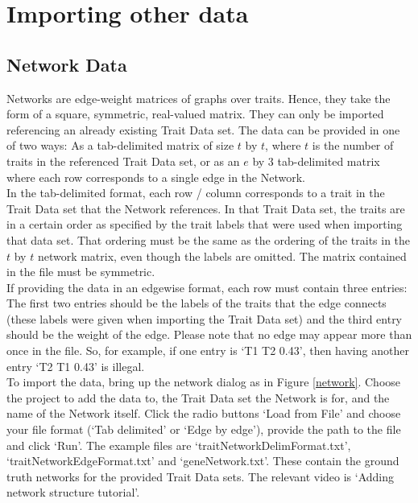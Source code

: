 \documentclass{article}
\begin{document}
\section{Importing other data}

\subsection{Network Data}

Networks are edge-weight matrices of graphs over traits. Hence, they take the form of a square, symmetric, real-valued matrix. They can only be imported referencing an already existing Trait Data set. The data can be provided in one of two ways: As a tab-delimited matrix of size $t$ by $t$, where $t$ is the number of traits in the referenced Trait Data set, or as an $e$ by 3 tab-delimited matrix where each row corresponds to a single edge in the Network. \\

In the tab-delimited format, each row / column corresponds to a trait in the Trait Data set that the Network references. In that Trait Data set, the traits are in a certain order as specified by the trait labels that were used when importing that data set. That ordering must be the same as the ordering of the traits in the $t$ by $t$ network matrix, even though the labels are omitted. The matrix contained in the file must be symmetric.\\

If providing the data in an edgewise format, each row must contain three entries: The first two entries should be the labels of the traits that the edge connects (these labels were given when importing the Trait Data set) and the third entry should be the weight of the edge. Please note that no edge may appear more than once in the file. So, for example, if one entry is `T1 T2 0.43', then having another entry `T2 T1 0.43' is illegal.\\

To import the data, bring up the network dialog as in Figure \ref{network}. Choose the project to add the data to, the Trait Data set the Network is for, and the name of the Network itself. Click the radio buttons `Load from File' and choose your file format (`Tab delimited' or `Edge by edge'), provide the path to the file and click `Run'. The example files are `traitNetworkDelimFormat.txt', `traitNetworkEdgeFormat.txt' and `geneNetwork.txt'. These contain the ground truth networks for the provided Trait Data sets. The relevant video is `Adding network structure tutorial'.
\end{document}
